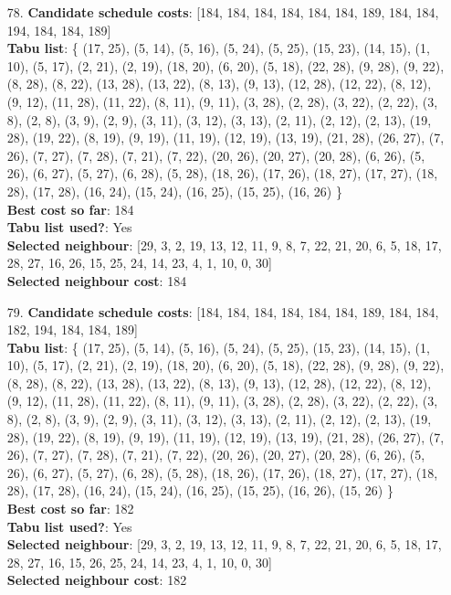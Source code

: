 \documentclass[fleqn]{article}
\begin{document}
\begin{itemize}
    \item[78.] \textbf{Candidate schedule costs}: [184, 184, 184, 184, 184, 184, 189, 184, 184, 194, 184, 184, 189] \\
    \textbf{Tabu list}: \{ (17, 25), (5, 14), (5, 16), (5, 24), (5, 25), (15, 23), (14, 15), (1, 10), (5, 17), (2, 21), (2, 19), (18, 20), (6, 20), (5, 18), (22, 28), (9, 28), (9, 22), (8, 28), (8, 22), (13, 28), (13, 22), (8, 13), (9, 13), (12, 28), (12, 22), (8, 12), (9, 12), (11, 28), (11, 22), (8, 11), (9, 11), (3, 28), (2, 28), (3, 22), (2, 22), (3, 8), (2, 8), (3, 9), (2, 9), (3, 11), (3, 12), (3, 13), (2, 11), (2, 12), (2, 13), (19, 28), (19, 22), (8, 19), (9, 19), (11, 19), (12, 19), (13, 19), (21, 28), (26, 27), (7, 26), (7, 27), (7, 28), (7, 21), (7, 22), (20, 26), (20, 27), (20, 28), (6, 26), (5, 26), (6, 27), (5, 27), (6, 28), (5, 28), (18, 26), (17, 26), (18, 27), (17, 27), (18, 28), (17, 28), (16, 24), (15, 24), (16, 25), (15, 25), (16, 26) \} \\
    \textbf{Best cost so far}: 184 \\
    \textbf{Tabu list used?}: Yes \\
    \textbf{Selected neighbour}: [29, 3, 2, 19, 13, 12, 11, 9, 8, 7, 22, 21, 20, 6, 5, 18, 17, 28, 27, 16, 26, 15, 25, 24, 14, 23, 4, 1, 10, 0, 30] \\
    \textbf{Selected neighbour cost}: 184
      

    \item[79.] \textbf{Candidate schedule costs}: [184, 184, 184, 184, 184, 184, 189, 184, 184, 182, 194, 184, 184, 189] \\
    \textbf{Tabu list}: \{ (17, 25), (5, 14), (5, 16), (5, 24), (5, 25), (15, 23), (14, 15), (1, 10), (5, 17), (2, 21), (2, 19), (18, 20), (6, 20), (5, 18), (22, 28), (9, 28), (9, 22), (8, 28), (8, 22), (13, 28), (13, 22), (8, 13), (9, 13), (12, 28), (12, 22), (8, 12), (9, 12), (11, 28), (11, 22), (8, 11), (9, 11), (3, 28), (2, 28), (3, 22), (2, 22), (3, 8), (2, 8), (3, 9), (2, 9), (3, 11), (3, 12), (3, 13), (2, 11), (2, 12), (2, 13), (19, 28), (19, 22), (8, 19), (9, 19), (11, 19), (12, 19), (13, 19), (21, 28), (26, 27), (7, 26), (7, 27), (7, 28), (7, 21), (7, 22), (20, 26), (20, 27), (20, 28), (6, 26), (5, 26), (6, 27), (5, 27), (6, 28), (5, 28), (18, 26), (17, 26), (18, 27), (17, 27), (18, 28), (17, 28), (16, 24), (15, 24), (16, 25), (15, 25), (16, 26), (15, 26) \} \\
    \textbf{Best cost so far}: 182 \\
    \textbf{Tabu list used?}: Yes \\
    \textbf{Selected neighbour}: [29, 3, 2, 19, 13, 12, 11, 9, 8, 7, 22, 21, 20, 6, 5, 18, 17, 28, 27, 16, 15, 26, 25, 24, 14, 23, 4, 1, 10, 0, 30] \\
    \textbf{Selected neighbour cost}: 182
      


\end{itemize}
\end{document}
